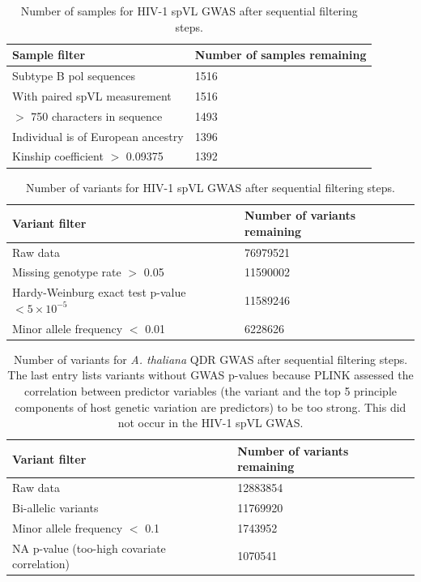 \documentclass[11pt]{article}
\begin{document}
\begin{table}[H]
\caption{Number of samples for HIV-1 spVL GWAS after sequential filtering steps.}
    \begin{tabularx}{\linewidth}{XX}
    \hline
    Sample filter & Number of samples remaining \\
    \hline
    Subtype B pol sequences & 1516 \\
    With paired spVL measurement & 1516 \\
    $>$ 750 characters in sequence & 1493 \\
    Individual is of European ancestry & 1396 \\
    Kinship coefficient $>$ 0.09375 & 1392 \\ 
    \hline
    \end{tabularx}
    \label{tab:sample-filtering}
\end{table}

\begin{table}[H]
\caption{Number of variants for HIV-1 spVL GWAS after sequential filtering steps.}
	\begin{tabularx}{\linewidth}{XX}
	\hline
	Variant filter & Number of variants remaining \\
	\hline 
	Raw data & 76979521 \\
	Missing genotype rate $>$ 0.05 & 11590002 \\
	Hardy-Weinburg exact test p-value $< 5 \times 10^{-5}$ & 11589246 \\
	Minor allele frequency $<$ 0.01 & 6228626 \\ \hline			
	\end{tabularx}
	\label{tab:variant-filtering}
\end{table}

\begin{table}[H]
\caption{Number of variants for \emph{A. thaliana} QDR GWAS after sequential filtering steps. The last entry lists variants without GWAS p-values because PLINK assessed the correlation between predictor variables (the variant and the top 5 principle components of host genetic variation are predictors) to be too strong. This did not occur in the HIV-1 spVL GWAS.}
	\begin{tabularx}{\linewidth}{XX}
	\hline
	Variant filter & Number of variants remaining \\
	\hline 
	Raw data & 12883854 \\
	Bi-allelic variants & 11769920 \\
	Minor allele frequency $<$ 0.1 & 1743952 \\
	NA p-value (too-high covariate correlation) & 1070541 \\ \hline			
	\end{tabularx}
	\label{tab:variant-filtering-qdr}
\end{table}
\end{document}

